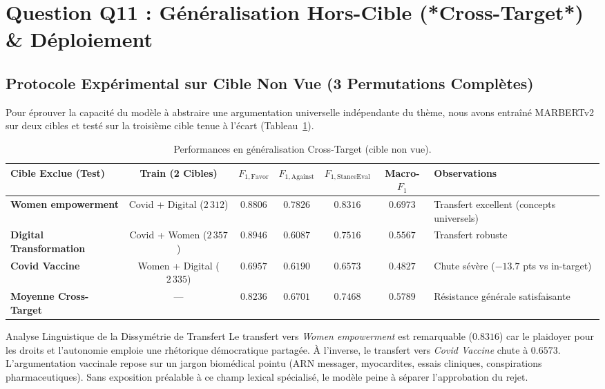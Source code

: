 \documentclass[11pt,a4paper]{article}
\begin{document}
\section{Question Q11 : Généralisation Hors-Cible (*Cross-Target*) \& Déploiement}

\subsection{Protocole Expérimental sur Cible Non Vue (3 Permutations Complètes)}
Pour éprouver la capacité du modèle à abstraire une argumentation universelle indépendante du thème, nous avons entraîné MARBERTv2 sur deux cibles et testé sur la troisième cible tenue à l'écart (Tableau~\ref{tab:crosstarget}).

\begin{table}[htbp]
\centering
\caption{Performances en généralisation Cross-Target (cible non vue).}
\label{tab:crosstarget}
\begin{tabularx}{\textwidth}{lcccccX}
\toprule
\textbf{Cible Exclue (Test)} & \textbf{Train (2 Cibles)} & \textbf{$F_{1,\text{Favor}}$} & \textbf{$F_{1,\text{Against}}$} & \textbf{$F_{1,\text{StanceEval}}$} & \textbf{Macro-$F_1$} & \textbf{Observations} \\
\midrule
\textbf{Women empowerment} & Covid + Digital ($2\,312$) & $0.8806$ & $0.7826$ & $\mathbf{0.8316}$ & $0.6973$ & Transfert excellent (concepts universels) \\
\textbf{Digital Transformation} & Covid + Women ($2\,357$) & $0.8946$ & $0.6087$ & $\mathbf{0.7516}$ & $0.5567$ & Transfert robuste \\
\textbf{Covid Vaccine} & Women + Digital ($2\,335$) & $0.6957$ & $0.6190$ & $\mathbf{0.6573}$ & $0.4827$ & Chute sévère ($-13.7$ pts vs in-target) \\
\midrule
\textbf{Moyenne Cross-Target} & — & $\mathbf{0.8236}$ & $\mathbf{0.6701}$ & $\mathbf{0.7468}$ & $\mathbf{0.5789}$ & Résistance générale satisfaisante \\
\bottomrule
\end{tabularx}
\end{table}

\begin{infobox}{Analyse Linguistique de la Dissymétrie de Transfert}
Le transfert vers \textit{Women empowerment} est remarquable ($0.8316$) car le plaidoyer pour les droits et l'autonomie emploie une rhétorique démocratique partagée. À l'inverse, le transfert vers \textit{Covid Vaccine} chute à $0.6573$. L'argumentation vaccinale repose sur un jargon biomédical pointu (ARN messager, myocardites, essais cliniques, conspirations pharmaceutiques). Sans exposition préalable à ce champ lexical spécialisé, le modèle peine à séparer l'approbation du rejet.
\end{infobox}
\end{document}

